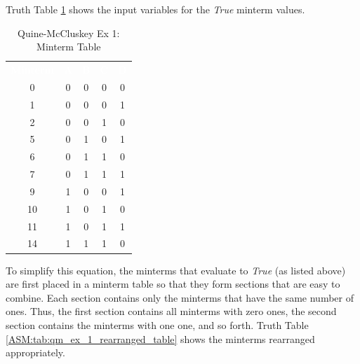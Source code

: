 Truth Table \ref{ASM:tab:qm_ex_1_minterm_table} shows the input variables for the \emph{True} minterm values.

\begin{table}[H]
	\sffamily
	\newcommand{\head}[1]{\textcolor{white}{\textbf{#1}}}		
	\begin{center}
		\begin{tabular}{ccccc} 
			\rowcolor{black!75}
			\head{Minterm} & \head{A} & \head{B} & \head{C} & \head{D} \\
			0 & 0 & 0 & 0 & 0 \\
			1 & 0 & 0 & 0 & 1 \\
			2 & 0 & 0 & 1 & 0 \\
			5 & 0 & 1 & 0 & 1 \\
			6 & 0 & 1 & 1 & 0 \\
			7 & 0 & 1 & 1 & 1 \\
			9 & 1 & 0 & 0 & 1 \\
			10 & 1 & 0 & 1 & 0 \\
			11 & 1 & 0 & 1 & 1 \\
			14 & 1 & 1 & 1 & 0 
		\end{tabular}
	\end{center}
	\caption{Quine-McCluskey Ex 1: Minterm Table}
  \label{ASM:tab:qm_ex_1_minterm_table}
\end{table}

To simplify this equation, the minterms that evaluate to \emph{True} (as listed above) are first placed in a minterm table so that they form sections that are easy to combine. Each section contains only the minterms that have the same number of ones. Thus, the first section contains all minterms with zero ones, the second section contains the minterms with one one, and so forth. Truth Table \ref{ASM:tab:qm_ex_1_rearranged_table} shows the minterms rearranged appropriately.

